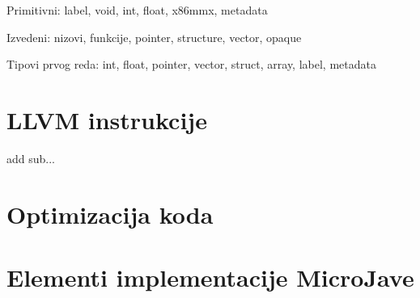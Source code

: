 Primitivni: label, void, int, float, x86mmx, metadata

Izvedeni: nizovi, funkcije, pointer, structure, vector, opaque

Tipovi prvog reda: int, float, pointer, vector, struct, array, label, metadata


\section{LLVM instrukcije}

add sub...

\section{Optimizacija koda}




\section{Elementi implementacije MicroJave}

